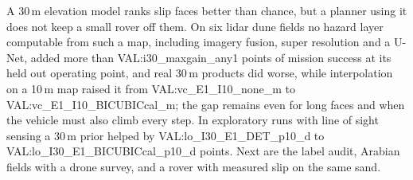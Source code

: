 A 30\,m elevation model ranks slip faces better than chance, but a planner using it does not keep a small rover off them. On six lidar dune fields no hazard layer computable from such a map, including imagery fusion, super resolution and a U-Net, added more than {{VAL:i30_maxgain_any1}} points of mission success at its held out operating point, and real 30\,m products did worse, while interpolation on a 10\,m map raised it from {{VAL:vc_E1_I10_none_m}} to {{VAL:vc_E1_I10_BICUBICcal_m}}; the gap remains even for long faces and when the vehicle must also climb every step. In exploratory runs with line of sight sensing a 30\,m prior helped by {{VAL:lo_I30_E1_DET_p10_d}} to {{VAL:lo_I30_E1_BICUBICcal_p10_d}} points. Next are the label audit, Arabian fields with a drone survey, and a rover with measured slip on the same sand.
